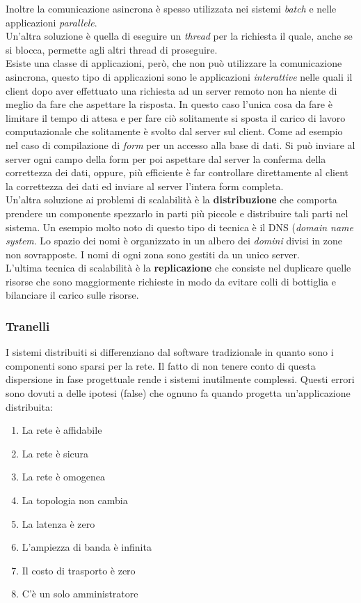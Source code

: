Inoltre la comunicazione asincrona è spesso utilizzata nei sistemi \emph{batch} e nelle applicazioni \emph{parallele}.\\
Un'altra soluzione è quella di eseguire un \emph{thread} per la richiesta il quale, anche se si blocca, permette agli altri thread di proseguire.\\
Esiste una classe di applicazioni, però, che non può utilizzare la comunicazione asincrona, questo tipo di applicazioni sono le applicazioni \emph{interattive} nelle quali il client dopo aver effettuato una richiesta ad un server remoto non ha niente di meglio da fare che aspettare la risposta. In questo caso l'unica cosa da fare è limitare il tempo di attesa e per fare ciò solitamente si sposta il carico di lavoro computazionale che solitamente è svolto dal server sul client. Come ad esempio nel caso di compilazione di \emph{form} per un accesso alla base di dati. Si può inviare al server ogni campo della form per poi aspettare dal server la conferma della correttezza dei dati, oppure, più efficiente è far controllare direttamente al client la correttezza dei dati ed inviare al server l'intera form completa.\\
Un'altra soluzione ai problemi di scalabilità è la \textbf{distribuzione} che comporta prendere un componente spezzarlo in parti più piccole e distribuire tali parti nel sistema. Un esempio molto noto di questo tipo di tecnica è il DNS (\emph{domain name system}. Lo spazio dei nomi è organizzato in un albero dei \emph{domini} divisi in zone non sovrapposte. I nomi di ogni zona sono gestiti da un unico server.\\
L'ultima tecnica di scalabilità è la \textbf{replicazione} che consiste nel duplicare quelle risorse che sono maggiormente richieste in modo da evitare colli di bottiglia e bilanciare il carico sulle risorse.
\subsubsection{Tranelli}
I sistemi distribuiti si differenziano dal software tradizionale in quanto sono i componenti sono sparsi per la rete. Il fatto di non tenere conto di questa dispersione in fase progettuale rende i sistemi inutilmente complessi. Questi errori sono dovuti a delle ipotesi (false) che ognuno fa quando progetta un'applicazione distribuita:
\begin{enumerate}
\item La rete è affidabile
\item La rete è sicura
\item La rete è omogenea
\item La topologia non cambia
\item La latenza è zero
\item L'ampiezza di banda è infinita
\item Il costo di trasporto è zero
\item C'è un solo amministratore
\end{enumerate}
